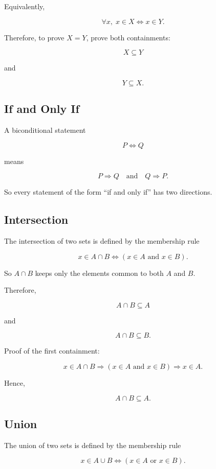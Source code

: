 \documentclass{article}
\begin{document}
	Equivalently,
	
	\[
	\forall x,\; x \in X \iff x \in Y.
	\]
	
	Therefore, to prove \(X = Y\), prove both containments:
	
	\[
	X \subseteq Y
	\]
	
	and
	
	\[
	Y \subseteq X.
	\]
	
	\subsection{If and Only If}
	
	A biconditional statement
	
	\[
	P \iff Q
	\]
	
	means
	
	\[
	P \Rightarrow Q
	\quad \text{and} \quad
	Q \Rightarrow P.
	\]
	
	So every statement of the form ``if and only if'' has two directions.
	
	\subsection{Intersection}
	
	The intersection of two sets is defined by the membership rule
	
	\[
	x \in A \cap B
	\iff
	(x \in A \text{ and } x \in B).
	\]
	
	So \(A \cap B\) keeps only the elements common to both \(A\) and \(B\).
	
	Therefore,
	
	\[
	A \cap B \subseteq A
	\]
	
	and
	
	\[
	A \cap B \subseteq B.
	\]
	
	Proof of the first containment:
	
	\[
	x \in A \cap B
	\Rightarrow
	(x \in A \text{ and } x \in B)
	\Rightarrow
	x \in A.
	\]
	
	Hence,
	
	\[
	A \cap B \subseteq A.
	\]
	
	\subsection{Union}
	
	The union of two sets is defined by the membership rule
	
	\[
	x \in A \cup B
	\iff
	(x \in A \text{ or } x \in B).
	\]
	
\end{document}
